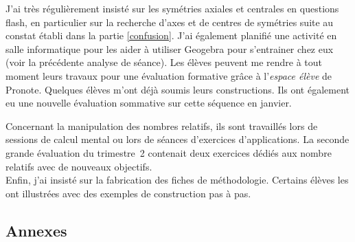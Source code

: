 J'ai très régulièrement insisté sur les symétries axiales et centrales en questions flash, en particulier sur la recherche d'axes et de centres de symétries suite au constat établi dans la partie \ref{confusion}. J'ai également planifié une activité en salle informatique pour les aider à utiliser Geogebra pour s'entrainer chez eux (voir la précédente analyse de séance). Les élèves peuvent me rendre à tout moment leurs travaux pour une évaluation formative grâce à l'\textit{espace élève} de Pronote. Quelques élèves m'ont déjà soumis leurs constructions. Ils ont également eu une nouvelle évaluation sommative sur cette séquence en janvier.

Concernant la manipulation des nombres relatifs, ils sont travaillés lors de sessions de calcul mental ou lors de séances d'exercices d'applications. La seconde grande évaluation du trimestre~2 contenait deux exercices dédiés aux nombre relatifs avec de nouveaux objectifs.\\

Enfin, j'ai insisté sur la fabrication des fiches de méthodologie. Certains élèves les ont illustrées avec des exemples de construction pas à pas.

\newpage
\subsection{Annexes}

